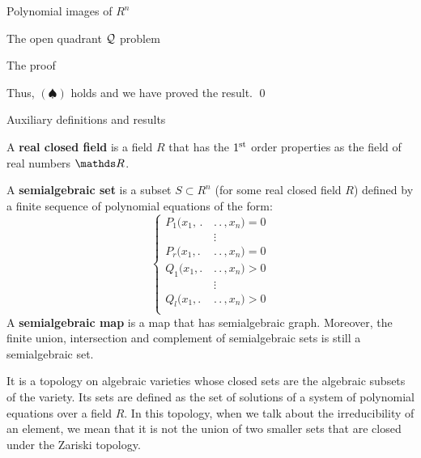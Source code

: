 \documentclass[11pt, a4paper, english, twoside, notitlepage]{report}
\begin{document}
\begin{chapter}{Polynomial images of $R^n$}
\begin{section}{The open quadrant $\mathcal{Q}$ problem}
\begin{subsection}{The proof}
\begin{Proof}
			
			Thus, $(\spadesuit)$ holds and we have proved the result. \qed


		\end{Proof}
		
	\end{subsection}
	
\end{section}


\end{chapter}


\appendix
\begin{chapter}{Auxiliary definitions and results}

\begin{definition}\label{realCField}
	A \textbf{real closed field} is a field $R$ that has the $1\textsuperscript{st}$ order properties as the field of real numbers $\R$.
\end{definition}

\begin{definition}\label{semialgSet}
	A \textbf{semialgebraic set} is a subset $S \subset R^n$ (for some real closed field $R$) defined by a finite sequence of polynomial equations of the form:
	\begin{equation*}
	\left\{
	\begin{aligned}
		P_1(x_1,\, .\,&.\,.\, , x_n) = 0\\
		&\vdots\\
		P_r(x_1, .\,&.\,.\, , x_n) = 0 \\
		Q_1(x_1, .\,&.\,.\, , x_n) > 0 \\
		&\vdots\\
		Q_l(x_1, .\,&.\,.\, , x_n) > 0 \\
	\end{aligned}
	\right.
	\end{equation*}
	A \textbf{semialgebraic map} is a map that has semialgebraic graph. Moreover, the finite union, intersection and complement of semialgebraic sets is still a semialgebraic set.
\end{definition}

\begin{definition}\label{zariski}
	It is a topology on algebraic varieties whose closed sets are the algebraic subsets of the variety. Its sets are defined as the set of solutions of a system of polynomial equations over a field $R$. In this topology, when we talk about the irreducibility of an element, we mean that it is not the union of two smaller sets that are closed under the Zariski topology.
\end{definition}


\end{chapter}
\end{document}
